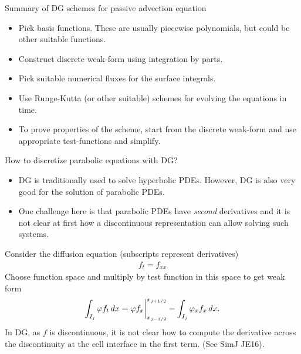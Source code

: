 \documentclass[aspectratio=169]{beamer}
\begin{document}

\begin{frame}{Summary of DG schemes for passive advection equation}

  \begin{itemize}
  \item Pick basis functions. These are usually piecewise polynomials,
    but could be other suitable functions.
  \item Construct discrete weak-form using integration by parts.
  \item Pick suitable numerical fluxes for the surface integrals.
  \item Use Runge-Kutta (or other suitable) schemes for evolving the
    equations in time.
  \item To prove properties of the scheme, start from the discrete
    weak-form and use appropriate test-functions and simplify.
  \end{itemize}

\end{frame}

\begin{frame}{How to discretize parabolic equations with DG?}
  \footnotesize%
  \begin{itemize}
  \item DG is traditionally used to solve hyperbolic PDEs. However, DG is
    also very good for the solution of parabolic PDEs.
  \item One challenge here is that parabolic PDEs have \emph{second}
    derivatives and it is not clear at first how a discontinuous
    representation can allow solving such systems.
  \end{itemize}
  Consider the diffusion equation (subscripts represent derivatives)
  \begin{align*}
    f_t = f_{xx}
  \end{align*}
  Choose function space and multiply by test function in this space to
  get weak form
  \begin{align*}
    \int_{I_j} \varphi f_t \thinspace dx =   \varphi f_x \bigg|^{x_{j+1/2}}_{x_{j-1/2}}
    -
    \int_{I_j} \varphi_{x} f_x \thinspace dx.
  \end{align*}
  In DG, as $f$ is discontinuous, it is not clear how to compute the
  derivative across the discontinuity at the cell interface in the
  first term. (See SimJ JE16).
  
\end{frame}
\end{document}
